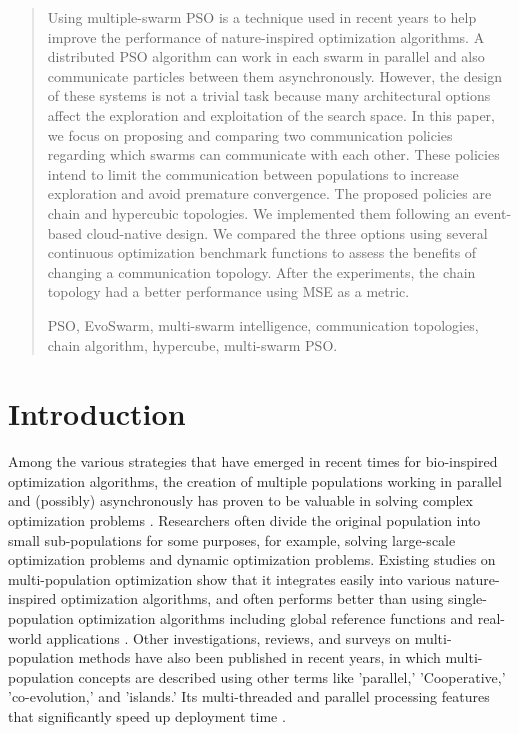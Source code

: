 \documentclass[runningheads]{llncs}
\newcommand{\keywords}[1]{\par\addvspace\baselineskip
\noindent\keywordname\enspace\ignorespaces#1}
\begin{document}
\begin{abstract}

  Using multiple-swarm PSO is a technique used in recent years to help improve
  the performance of nature-inspired optimization algorithms. A distributed PSO
  algorithm can work in each swarm in parallel and also communicate particles
  between them asynchronously. However, the design of these systems is not a
  trivial task because many architectural options affect the exploration and
  exploitation of the search space. In this paper, we focus on proposing and
  comparing two communication policies regarding which swarms can communicate
  with each other. These policies intend to limit the communication between
  populations to increase exploration and avoid premature convergence. The
  proposed policies are chain and hypercubic topologies. We implemented them
  following an event-based cloud-native design. We compared the three options
  using several continuous optimization benchmark functions to assess the
  benefits of changing a communication topology. After the experiments, the
  chain topology had a better performance using MSE as a metric.
  
  
                   

\keywords{PSO, EvoSwarm, multi-swarm intelligence, communication topologies,
 chain algorithm, hypercube, multi-swarm PSO.}
\end{abstract}


\section{Introduction}


Among the various strategies that have emerged in recent times for bio-inspired
optimization algorithms, the creation of multiple populations working
in parallel and (possibly) asynchronously has proven to be valuable in 
solving complex optimization problems \cite{a1}.
Researchers often divide the original population into small sub-populations for some
purposes, for example, solving large-scale optimization problems and dynamic
optimization problems. Existing studies on multi-population optimization show
that it integrates easily into various nature-inspired optimization algorithms,
and often performs better than using single-population optimization algorithms
including global reference functions and real-world applications \cite{b11} \cite{b12}.
Other investigations, reviews, and surveys on multi-population methods have also
been published in recent years, in which multi-population concepts are described
using other terms like 'parallel,' 'Cooperative,' 'co-evolution,' and 'islands.'
Its multi-threaded and parallel processing features that significantly speed up
deployment time \cite{b13} \cite{b14}.
\end{document}

